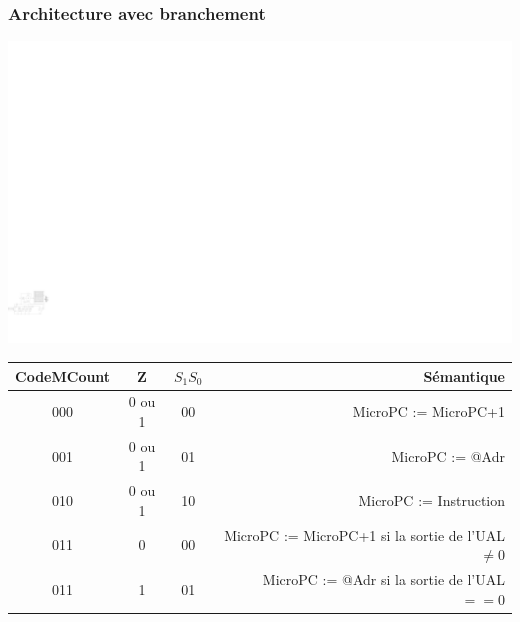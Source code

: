 \documentclass{beamer}
\begin{document}
\begin{frame}
\frametitle{Architecture avec branchement}
\centering\includegraphics[width=0.6\linewidth]{Figs/premier_chemin_seq_jmp.pdf}\\
\begin{scriptsize}
\begin{tabular}{cc|cr}
CodeMCount & Z & $S_1S_0$ & Sémantique\\
\hline
000 &  0 ou 1 & 00 & MicroPC := MicroPC+1\\
001 &  0 ou 1 & 01 & MicroPC := @Adr\\
010 &  0 ou 1 & 10 & MicroPC := Instruction\\
011 &  0 & 00 & MicroPC := MicroPC+1  si la sortie de l'UAL $\neq 0$\\
011 &  1 & 01 & MicroPC := @Adr si la sortie de l'UAL $== 0$
\end{tabular}
\end{scriptsize}
\end{frame}




\end{document}
